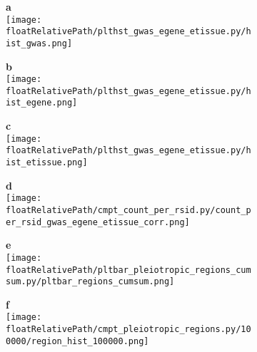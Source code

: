 \begin{figure}[!ht]
    \centering

    \begin{subfigure}[]{.49\textwidth}
        \textbf{a}
        \\
        \texttt{[image: \\floatRelativePath/plthst\_gwas\_egene\_etissue.py/hist\_gwas.png]}
    \end{subfigure}
    \begin{subfigure}[]{.49\textwidth}
        \textbf{b}
        \\
        \texttt{[image: \\floatRelativePath/plthst\_gwas\_egene\_etissue.py/hist\_egene.png]}
    \end{subfigure}

    \begin{subfigure}[]{.49\textwidth}
        \textbf{c}
        \\
        \texttt{[image: \\floatRelativePath/plthst\_gwas\_egene\_etissue.py/hist\_etissue.png]}
    \end{subfigure}
    \begin{subfigure}[]{.49\textwidth}
        \textbf{d}
        \\
        \texttt{[image: \\floatRelativePath/cmpt\_count\_per\_rsid.py/count\_per\_rsid\_gwas\_egene\_etissue\_corr.png]}
    \end{subfigure}

        \begin{subfigure}[]{.49\textwidth}
        \textbf{e}
        \\
        \texttt{[image: \\floatRelativePath/pltbar\_pleiotropic\_regions\_cumsum.py/pltbar\_regions\_cumsum.png]}
    \end{subfigure}
    \begin{subfigure}[]{.49\textwidth}
        \textbf{f}
        \\
        \texttt{[image: \\floatRelativePath/cmpt\_pleiotropic\_regions.py/100000/region\_hist\_100000.png]}
    \end{subfigure}

    \caption{}

\end{figure}

%
%

